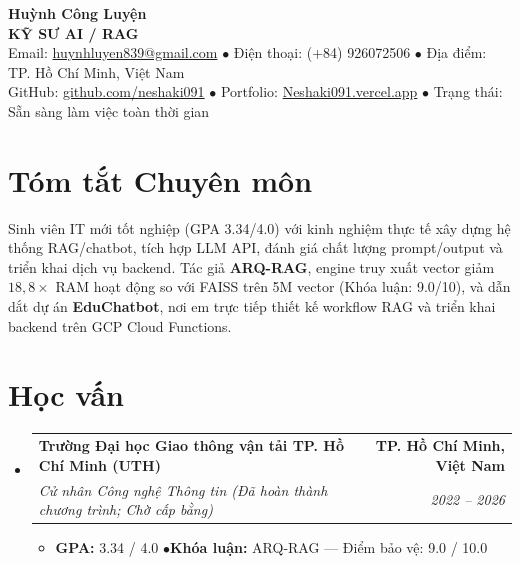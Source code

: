 \documentclass[10pt,letterpaper]{article}
\makeatletter
\newcommand{\resumeItemListStart}{\begin{itemize}[leftmargin=1.15em, label={\small$\bullet$}, itemsep=1.1pt, parsep=0pt, topsep=0.6pt, partopsep=0pt]}
\newcommand{\resumeItemListEnd}{\end{itemize}\vspace{-1pt}}
\newcommand{\resumeItem}[1]{\item \small{#1}}
\newcommand{\resumeSubheading}[4]{
  \item[]
  \begin{tabular*}{\textwidth}[t]{l@{\extracolsep{\fill}}r}
    \textbf{#1} & \textbf{\small #2} \\
    \textit{\small #3} & \textit{\small #4} \\
  \end{tabular*}\vspace{1pt}
}
\makeatother
\begin{document}
\begin{center}
  {\Large \textbf{Huỳnh Công Luyện}} \\ \vspace{2pt}
  {\large \textbf{\color{secondary}KỸ SƯ AI / RAG}}  \\ \vspace{2.5pt}
  \small{
    Email: \href{mailto:huynhluyen839@gmail.com}{huynhluyen839@gmail.com} \quad$\bullet$\quad
    Điện thoại: (+84) 926072506 \quad$\bullet$\quad
    Địa điểm: TP. Hồ Chí Minh, Việt Nam
  } \\ \vspace{1.5pt}
  \small{
    GitHub: \href{https://github.com/neshaki091}{github.com/neshaki091} \quad$\bullet$\quad
    Portfolio: \href{https://Neshaki091.vercel.app}{Neshaki091.vercel.app} \quad$\bullet$\quad
    Trạng thái: Sẵn sàng làm việc toàn thời gian
  }
\end{center}
\vspace{-3pt}

\section{Tóm tắt Chuyên môn}
\small{
Sinh viên IT mới tốt nghiệp (GPA 3.34/4.0) với kinh nghiệm thực tế xây dựng hệ thống RAG/chatbot, tích hợp LLM API, đánh giá chất lượng prompt/output và triển khai dịch vụ backend. Tác giả \textbf{ARQ-RAG}, engine truy xuất vector giảm $18,8\times$ RAM hoạt động so với FAISS trên 5M vector (Khóa luận: 9.0/10), và dẫn dắt dự án \textbf{EduChatbot}, nơi em trực tiếp thiết kế workflow RAG và triển khai backend trên GCP Cloud Functions.
}
\vspace{3.5pt}

\section{Học vấn}
\begin{itemize}[leftmargin=0pt, label={}]
  \resumeSubheading
    {Trường Đại học Giao thông vận tải TP. Hồ Chí Minh (UTH)}{TP. Hồ Chí Minh, Việt Nam}
    {Cử nhân Công nghệ Thông tin \textnormal{(Đã hoàn thành chương trình; Chờ cấp bằng)}}{2022 -- 2026}
    \resumeItemListStart
      \resumeItem{\textbf{GPA:} 3.34 / 4.0 \quad$\bullet$\quad \textbf{Khóa luận:} ARQ-RAG --- Điểm bảo vệ: 9.0 / 10.0}
    \resumeItemListEnd
\end{itemize}
\vspace{0pt}
\end{document}
